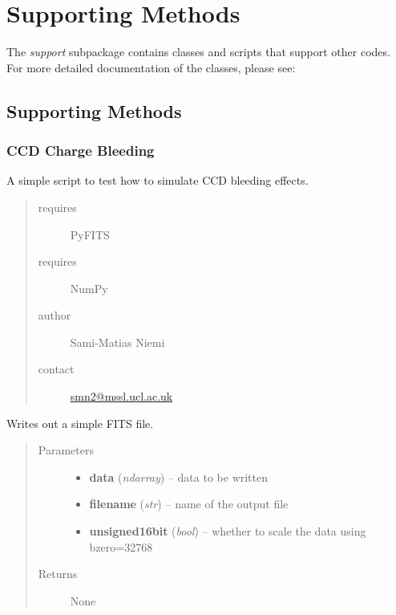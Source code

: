 \documentclass[a4paper,11pt,english]{sphinxmanual}
\begin{document}
\chapter{Supporting Methods}
\label{index:supporting-methods}
The \emph{support} subpackage contains classes and scripts that support other codes. For more detailed
documentation of the classes, please see:


\section{Supporting Methods}
\label{support:supporting-methods}\label{support:module-support.bleedingtest}\label{support::doc}

\subsection{CCD Charge Bleeding}
\label{support:ccd-charge-bleeding}
A simple script to test how to simulate CCD bleeding effects.
\begin{quote}\begin{description}
\item[{requires}] \leavevmode
PyFITS

\item[{requires}] \leavevmode
NumPy

\item[{author}] \leavevmode
Sami-Matias Niemi

\item[{contact}] \leavevmode
\href{mailto:smn2@mssl.ucl.ac.uk}{smn2@mssl.ucl.ac.uk}

\end{description}\end{quote}

\begin{fulllineitems}
\label{support:support.bleedingtest.writeFITSfile}
Writes out a simple FITS file.
\begin{quote}\begin{description}
\item[{Parameters}] \leavevmode\begin{itemize}
\item {} 
\textbf{data} (\emph{ndarray}) -- data to be written

\item {} 
\textbf{filename} (\emph{str}) -- name of the output file

\item {} 
\textbf{unsigned16bit} (\emph{bool}) -- whether to scale the data using bzero=32768

\end{itemize}

\item[{Returns}] \leavevmode
None

\end{description}\end{quote}

\end{fulllineitems}
\end{document}
